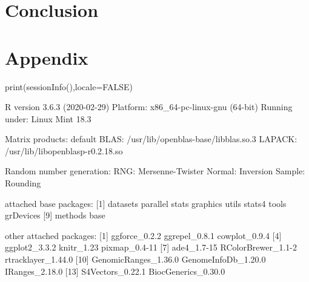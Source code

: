 \documentclass[a4paper,10pt]{article}
\begin{document}
\section{Conclusion}





\section{Appendix}

\begin{Schunk}
\begin{Sinput}
  print(sessionInfo(),locale=FALSE)
\end{Sinput}
\begin{Soutput}
R version 3.6.3 (2020-02-29)
Platform: x86_64-pc-linux-gnu (64-bit)
Running under: Linux Mint 18.3

Matrix products: default
BLAS:   /usr/lib/openblas-base/libblas.so.3
LAPACK: /usr/lib/libopenblasp-r0.2.18.so

Random number generation:
 RNG:     Mersenne-Twister 
 Normal:  Inversion 
 Sample:  Rounding 
 
attached base packages:
 [1] datasets  parallel  stats     graphics  utils     stats4    tools     grDevices
 [9] methods   base     

other attached packages:
 [1] ggforce_0.2.2        ggrepel_0.8.1        cowplot_0.9.4       
 [4] ggplot2_3.3.2        knitr_1.23           pixmap_0.4-11       
 [7] ade4_1.7-15          RColorBrewer_1.1-2   rtracklayer_1.44.0  
[10] GenomicRanges_1.36.0 GenomeInfoDb_1.20.0  IRanges_2.18.0      
[13] S4Vectors_0.22.1     BiocGenerics_0.30.0 


\end{Soutput}
\end{Schunk}
\end{document}

